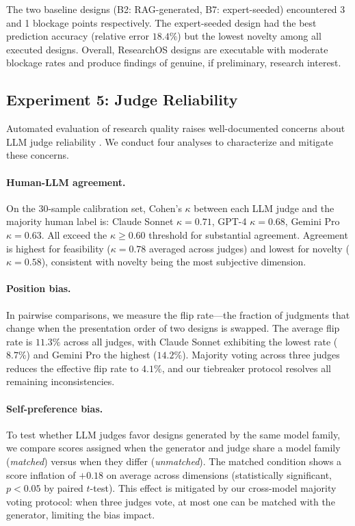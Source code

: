 The two baseline designs (B2: RAG-generated, B7: expert-seeded) encountered 3 and 1 blockage points respectively. The expert-seeded design had the best prediction accuracy (relative error $18.4\%$) but the lowest novelty among all executed designs. Overall, ResearchOS designs are executable with moderate blockage rates and produce findings of genuine, if preliminary, research interest.


\subsection{Experiment 5: Judge Reliability}
\label{subsec:judge_reliability}

Automated evaluation of research quality raises well-documented concerns about LLM judge reliability \cite{zheng2024judging}. We conduct four analyses to characterize and mitigate these concerns.

\paragraph{Human-LLM agreement.}
On the 30-sample calibration set, Cohen's $\kappa$ between each LLM judge and the majority human label is: Claude Sonnet $\kappa = 0.71$, GPT-4 $\kappa = 0.68$, Gemini Pro $\kappa = 0.63$. All exceed the $\kappa \geq 0.60$ threshold for substantial agreement. Agreement is highest for feasibility ($\kappa = 0.78$ averaged across judges) and lowest for novelty ($\kappa = 0.58$), consistent with novelty being the most subjective dimension.

\paragraph{Position bias.}
In pairwise comparisons, we measure the flip rate---the fraction of judgments that change when the presentation order of two designs is swapped. The average flip rate is $11.3\%$ across all judges, with Claude Sonnet exhibiting the lowest rate ($8.7\%$) and Gemini Pro the highest ($14.2\%$). Majority voting across three judges reduces the effective flip rate to $4.1\%$, and our tiebreaker protocol resolves all remaining inconsistencies.

\paragraph{Self-preference bias.}
To test whether LLM judges favor designs generated by the same model family, we compare scores assigned when the generator and judge share a model family (\emph{matched}) versus when they differ (\emph{unmatched}). The matched condition shows a score inflation of $+0.18$ on average across dimensions (statistically significant, $p < 0.05$ by paired $t$-test). This effect is mitigated by our cross-model majority voting protocol: when three judges vote, at most one can be matched with the generator, limiting the bias impact.

